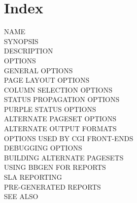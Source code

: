  



\section{Index}
\begin{description}
\item[NAME]
\item[SYNOPSIS]
\item[DESCRIPTION]
\item[OPTIONS]
\item[GENERAL OPTIONS]
\item[PAGE LAYOUT OPTIONS]
\item[COLUMN SELECTION OPTIONS]
\item[STATUS PROPAGATION OPTIONS]
\item[PURPLE STATUS OPTIONS]
\item[ALTERNATE PAGESET OPTIONS]
\item[ALTERNATE OUTPUT FORMATS]
\item[OPTIONS USED BY CGI FRONT-ENDS]
\item[DEBUGGING OPTIONS]
\item[BUILDING ALTERNATE PAGESETS]
\item[USING BBGEN FOR REPORTS]
\item[SLA REPORTING]
\item[PRE-GENERATED REPORTS]
\item[SEE ALSO]

\end{description}
